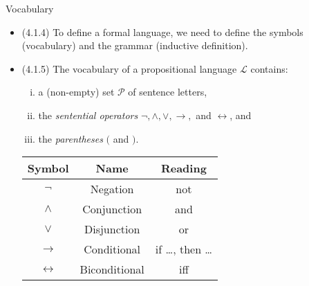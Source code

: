 \documentclass[../slides.tex]{subfiles}
\begin{document}
\begin{frame}{Vocabulary}

	\begin{itemize}
	
		\item (4.1.4) To define a formal language, we need to define the symbols (vocabulary) and the grammar (inductive definition).
		
		\item (4.1.5) The vocabulary of a propositional language $\mathcal{L}$ contains:		
		\begin{enumerate}[(i)]
		
			\item a (non-empty) set $\mathcal{P}$ of sentence letters,
						
			\item the \emph{sentential operators} $\neg,\land,\lor,\to,$ and $\leftrightarrow$, and 
			
			\item the \emph{parentheses} $($ and $)$.
		
		\end{enumerate}

		\begin{center}
			\begin{tabular}{c | c | c}
			Symbol & Name & Reading\\ \hline
			
			$\neg$ & Negation & not\\
			$\land$ & Conjunction & and\\
			$\lor$ & Disjunction & or\\
			$\to$ & Conditional & if \dots, then \dots\\
			$\leftrightarrow$ & Biconditional & iff
			\end{tabular}
		\end{center}	
	\end{itemize}

\end{frame}
\end{document}
